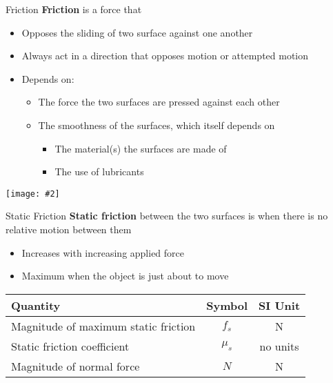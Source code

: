 \documentclass[12pt,compress,aspectratio=169]{beamer}
\newcommand{\pic}[2]{\texttt{[image: \#2]}}
\newcommand{\eq}[2]{\vspace{#1}{\Large\begin{displaymath}#2\end{displaymath}}}
\begin{document}
\begin{frame}{Friction}
  \textbf{Friction} is a force that
  \begin{itemize}
  \item Opposes the sliding of two surface against one another
  \item Always act in a direction that opposes motion or attempted motion
  \item Depends on:
    \begin{itemize}
    \item The force the two surfaces are pressed against each other
    \item The smoothness of the surfaces, which itself depends on
      \begin{itemize}
      \item The material(s) the surfaces are made of
      \item The use of lubricants
      \end{itemize}
  \end{itemize}
  \end{itemize}
  \begin{center}
    \pic{.5}{graphics/friction.png}
  \end{center}
\end{frame}



\begin{frame}{Static Friction}
  \textbf{Static friction} between the two surfaces is when there is no
  relative motion between them
  \begin{itemize}
  \item Increases with increasing applied force
  \item Maximum when the object is just about to move
  \end{itemize}

  \eq{-.35in}{
    \boxed{f_s\leq\mu_sN}
  }
  \begin{center}
    \begin{tabular}{l|c|c}
      \rowcolor{pink}
      \textbf{Quantity} & \textbf{Symbol} & \textbf{SI Unit} \\ \hline
      Magnitude of maximum static friction & $f_s$ & \si{\newton} \\
      Static friction coefficient  & $\mu_s$ & no units \\
      Magnitude of normal force    & $N$ & \si{\newton}
    \end{tabular}
  \end{center}
\end{frame}
\end{document}
